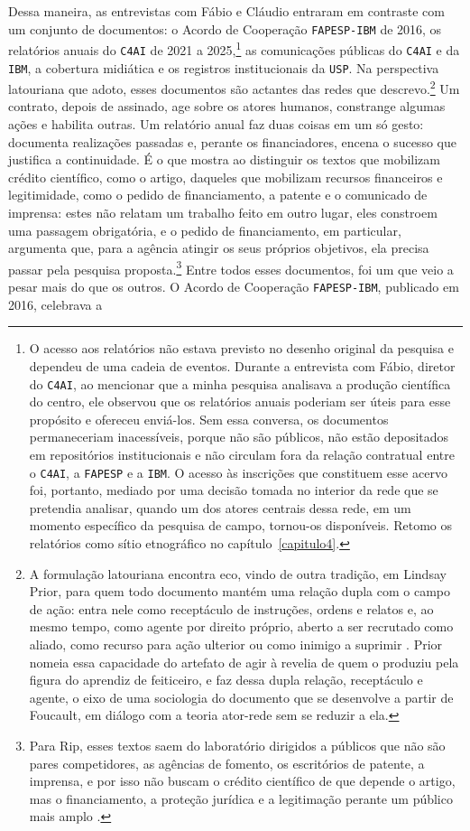 Dessa maneira, as entrevistas com Fábio e Cláudio entraram em contraste com um conjunto de documentos: o Acordo de Cooperação \texttt{FAPESP-IBM} de 2016, os relatórios anuais do \texttt{C4AI} de 2021 a 2025,\footnote{O acesso aos relatórios não estava previsto no desenho original da pesquisa e dependeu de uma cadeia de eventos. Durante a entrevista com Fábio, diretor do \texttt{C4AI}, ao mencionar que a minha pesquisa analisava a produção científica do centro, ele observou que os relatórios anuais poderiam ser úteis para esse propósito e ofereceu enviá-los. Sem essa conversa, os documentos permaneceriam inacessíveis, porque não são públicos, não estão depositados em repositórios institucionais e não circulam fora da relação contratual entre o \texttt{C4AI}, a \texttt{FAPESP} e a \texttt{IBM}. O acesso às inscrições que constituem esse acervo foi, portanto, mediado por uma decisão tomada no interior da rede que se pretendia analisar, quando um dos atores centrais dessa rede, em um momento específico da pesquisa de campo, tornou-os disponíveis. Retomo os relatórios como sítio etnográfico no capítulo~\ref{capitulo4}.} as comunicações públicas do \texttt{C4AI} e da \texttt{IBM}, a cobertura midiática e os registros institucionais da \texttt{USP}. Na perspectiva latouriana que adoto, esses documentos são actantes das redes que descrevo.\footnote{A formulação latouriana encontra eco, vindo de outra tradição, em Lindsay Prior, para quem todo documento mantém uma relação dupla com o campo de ação: entra nele como receptáculo de instruções, ordens e relatos e, ao mesmo tempo, como agente por direito próprio, aberto a ser recrutado como aliado, como recurso para ação ulterior ou como inimigo a suprimir \parencite[p.~12]{Prior2003Using}. Prior nomeia essa capacidade do artefato de agir à revelia de quem o produziu pela figura do aprendiz de feiticeiro, e faz dessa dupla relação, receptáculo e agente, o eixo de uma sociologia do documento que se desenvolve a partir de Foucault, em diálogo com a teoria ator-rede sem se reduzir a ela.} Um contrato, depois de assinado, age sobre os atores humanos, constrange algumas ações e habilita outras. Um relatório anual faz duas coisas em um só gesto: documenta realizações passadas e, perante os financiadores, encena o sucesso que justifica a continuidade. É o que \textcite{Rip1986Mobilising} mostra ao distinguir os textos que mobilizam crédito científico, como o artigo, daqueles que mobilizam recursos financeiros e legitimidade, como o pedido de financiamento, a patente e o comunicado de imprensa: estes não relatam um trabalho feito em outro lugar, eles constroem uma passagem obrigatória, e o pedido de financiamento, em particular, argumenta que, para a agência atingir os seus próprios objetivos, ela precisa passar pela pesquisa proposta.\footnote{Para Rip, esses textos saem do laboratório dirigidos a públicos que não são pares competidores, as agências de fomento, os escritórios de patente, a imprensa, e por isso não buscam o crédito científico de que depende o artigo, mas o financiamento, a proteção jurídica e a legitimação perante um público mais amplo \parencite[pp.~84--85]{Rip1986Mobilising}.} Entre todos esses documentos, foi um que veio a pesar mais do que os outros. O Acordo de Cooperação \texttt{FAPESP-IBM}, publicado em 2016, celebrava a 